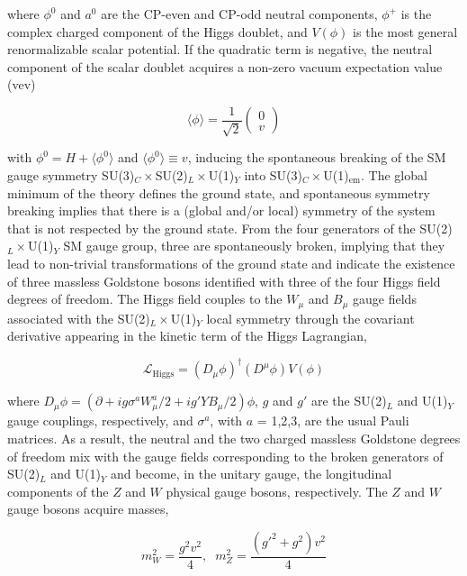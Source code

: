 where $\phi^0$ and $a^0$ are the CP-even and CP-odd neutral components, $\phi^+$ is the complex charged component of the Higgs doublet, and $V(\phi)$ is the most general renormalizable scalar potential. If the quadratic term is negative, the neutral component of the scalar doublet acquires a non-zero vacuum expectation value (vev)

\begin{equation}
    \langle\phi\rangle = \frac{1}{\sqrt{2}}
    \begin{pmatrix}
        0 \\ v
    \end{pmatrix}
\end{equation}

with $\phi^0 = H+\langle\phi^0\rangle$ and $\langle\phi^0\rangle \equiv v$, inducing the spontaneous breaking of the SM gauge symmetry SU(3)$_C\times$SU(2)$_L\times$U(1)$_Y$ into SU(3)$_C\times$U(1)$_\text{em}$. The global minimum of the theory defines the ground state, and spontaneous symmetry breaking implies that there is a (global and/or local) symmetry of the system that is not respected by the ground state. From the four generators of the SU(2)$_L\times$U(1)$_Y$ SM gauge group, three are spontaneously broken, implying that they lead to non-trivial transformations of the ground state and indicate the existence of three massless Goldstone bosons identified with three of the four Higgs field degrees of freedom. The Higgs field couples to the $W_\mu$ and $B_\mu$ gauge fields associated with the SU(2)$_L\times$U(1)$_Y$ local symmetry through the covariant derivative appearing in the kinetic term of the Higgs Lagrangian,

\begin{equation}
    \mathcal{L}_\text{Higgs} = (D_\mu\phi)^\dagger(D^\mu\phi) V(\phi)
\end{equation}

where $D_\mu\phi=(\partial + ig\sigma^aW^a_\mu/2 + ig'YB_\mu/2)\phi$, $g$ and $g'$ are the SU(2)$_L$ and U(1)$_Y$ gauge couplings, respectively, and $\sigma^a$, with $a$ = 1,2,3, are the usual Pauli matrices. As a result, the neutral and the two charged massless Goldstone degrees of freedom mix with the gauge fields corresponding to the broken generators of SU(2)$_L$ and U(1)$_Y$ and become, in the unitary gauge, the longitudinal components of the $Z$ and $W$ physical gauge bosons, respectively. The $Z$ and $W$ gauge bosons acquire masses,

\begin{equation}
    m_W^2 = \frac{g^2v^2}{4}, \hspace{7pt} m_Z^2 = \frac{(g'^2+g^2)v^2}{4}
\end{equation}

